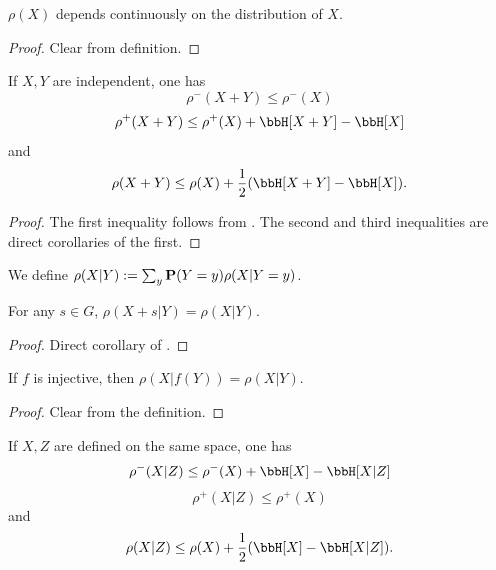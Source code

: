 \begin{lemma}\label{rho-cts}\leanok{} $\rho(X)$ depends continuously on the distribution of $X$.
\end{lemma}

\begin{proof}  \leanok Clear from definition.
\end{proof}

\begin{lemma}\label{rho-sums}\leanok  If $X,Y$ are independent, one has
  $$ \rho^-(X+Y) \leq \rho^-(X)$$
  $$ \rho^+(X+Y) \leq \rho^+(X) + \bbH[X+Y] - \bbH[X]$$
and
  $$ \rho(X+Y) \leq \rho(X) + \frac{1}{2}( \bbH[X+Y] - \bbH[X] ).$$
\end{lemma}

\begin{proof}\leanok
The first inequality follows from . The second and third inequalities are direct corollaries of the first.
\end{proof}


\begin{definition}\label{rho-cond-def}\leanok We define $\rho(X|Y) := \sum_y {\bf P}(Y=y) \rho(X|Y=y)$.
\end{definition}

\begin{lemma}\label{rho-cond-invariant}\leanok
  For any $s\in G$, $\rho(X+s|Y)=\rho(X|Y)$.
\end{lemma}
\begin{proof}
  \leanok
  Direct corollary of .
\end{proof}

\begin{lemma}\label{rho-cond-relabeled}\leanok
  If $f$ is injective, then $\rho(X|f(Y))=\rho(X|Y)$.
\end{lemma}
\begin{proof}\leanok
  Clear from the definition.
\end{proof}

\begin{lemma}\label{rho-cond}\leanok  If $X,Z$ are defined on the same space, one has
  $$ \rho^-(X|Z) \leq \rho^-(X) + \bbH[X] - \bbH[X|Z]$$
  $$ \rho^+(X|Z) \leq \rho^+(X)$$
and
  $$ \rho(X|Z) \leq \rho(X) + \frac{1}{2}( \bbH[X] - \bbH[X|Z] ).$$
\end{lemma}

